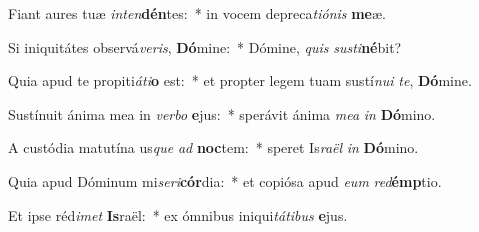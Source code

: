 \item Fiant aures tuæ \textit{in}\textit{ten}\textbf{dén}tes:~* in vocem depreca\textit{ti}\textit{ó}\textit{nis} \textbf{me}æ.
\item Si iniquitátes observá\textit{ve}\textit{ris}, \textbf{Dó}mine:~* Dómine, \textit{quis} \textit{sus}\textit{ti}\textbf{né}bit?
\item Quia apud te propiti\textit{á}\textit{ti}\textbf{o} est:~* et propter legem tuam sustí\textit{nu}\textit{i} \textit{te}, \textbf{Dó}mine.
\item Sustínuit ánima mea in \textit{ver}\textit{bo} \textbf{e}jus:~* sperávit ánima \textit{me}\textit{a} \textit{in} \textbf{Dó}mino.
\item A custódia matutína us\textit{que} \textit{ad} \textbf{noc}tem:~* speret Is\textit{ra}\textit{ël} \textit{in} \textbf{Dó}mino.
\item Quia apud Dóminum mi\textit{se}\textit{ri}\textbf{cór}dia:~* et copiósa apud \textit{e}\textit{um} \textit{red}\textbf{émp}tio.
\item Et ipse réd\textit{i}\textit{met} \textbf{Is}raël:~* ex ómnibus iniqui\textit{tá}\textit{ti}\textit{bus} \textbf{e}jus.
